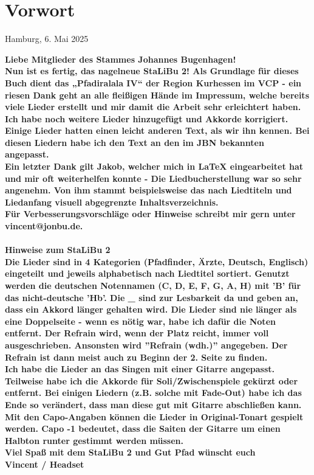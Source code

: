 \section*{Vorwort}

\begin{flushright}
    Hamburg, 6. Mai 2025
\end{flushright}


\bf Liebe Mitglieder des Stammes Johannes Bugenhagen! \sf \\

Nun ist es fertig, das nagelneue StaLiBu 2! Als Grundlage für dieses Buch dient das „Pfadiralala IV“ der Region Kurhessen im VCP - ein riesen Dank geht an alle fleißigen Hände im Impressum, welche bereits viele Lieder erstellt und mir damit die Arbeit sehr erleichtert haben. \\

Ich habe noch weitere Lieder hinzugefügt und Akkorde korrigiert. Einige Lieder hatten einen leicht anderen Text, als wir ihn kennen. Bei diesen Liedern habe ich den Text an den im JBN bekannten angepasst. \\

Ein letzter Dank gilt Jakob, welcher mich in LaTeX eingearbeitet hat und mir oft weiterhelfen konnte - Die Liedbucherstellung war so sehr angenehm. Von ihm stammt beispielsweise das nach Liedtiteln und Liedanfang visuell abgegrenzte Inhaltsverzeichnis. \\

Für Verbesserungsvorschläge oder Hinweise schreibt mir gern unter vincent@jonbu.de. \\ \\

\bf Hinweise zum StaLiBu 2 \sf \\

Die Lieder sind in 4 Kategorien (Pfadfinder, Ärzte, Deutsch, Englisch) eingeteilt und jeweils alphabetisch nach Liedtitel sortiert. Genutzt werden die deutschen Notennamen (C, D, E, F, G, A, H) mit 'B' für das nicht-deutsche 'Hb'. \newline
Die \_ sind zur Lesbarkeit da und geben an, dass ein Akkord länger gehalten wird. Die Lieder sind nie länger als eine Doppelseite - wenn es nötig war, habe ich dafür die Noten entfernt. Der Refrain wird, wenn der Platz reicht, immer voll ausgeschrieben. Ansonsten wird ''Refrain (wdh.)'' angegeben. Der Refrain ist dann meist auch zu Beginn der 2. Seite zu finden. \\

Ich habe die Lieder an das Singen mit einer Gitarre angepasst. Teilweise habe ich die Akkorde für Soli/Zwischenspiele gekürzt oder entfernt. Bei einigen Liedern (z.B. solche mit Fade-Out) habe ich das Ende so verändert, dass man diese gut mit Gitarre abschließen kann.
Mit den Capo-Angaben können die Lieder in Original-Tonart gespielt werden. Capo -1 bedeutet, dass die Saiten der Gitarre um einen Halbton runter gestimmt werden müssen. \\

Viel Spaß mit dem StaLiBu 2 und Gut Pfad wünscht euch\\
Vincent / Headset